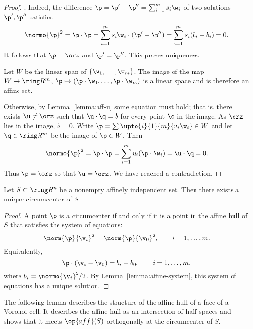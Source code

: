 \begin{cnl}
\begin{proof}
. Indeed, the difference 
$\p = \p'-\p'' = \sumupto{i}{1}{m}{ s_i \w_i}$ of two solutions
$\p',\p''$ satisfies
\[  
\normo{\p}^2=\p\cdot\p = \sumupto{i}{1}{m}{ s_i \w_i} \cdot (\p' - \p'') =
\sumupto{i}{1}{m}{ s_i (b_i-b_i)}= 0.
\] 
It follows that $\p=\orz$ and $\p'=\p''$.  This proves uniqueness.

Let $W$ be the linear span of $\setenumdots{\w}{1}{m}$.  The image of the
map $W\to\vecR{m}$, $\p\mapsto (\p\cdot\w_1,\ldots,\p\cdot\w_m)$ is
a linear space and is therefore an affine set.

Otherwise, by Lemma~\ref{lemma:aff-u} some equation must hold; that
is, there exists $\u\ne \orz$ such that $\u\cdot \q =b$ for every
point $\q$ in the image.  As $\orz$ lies in the image, $b=0$.  Write
$\p = \sum\upto{i}{1}{m}{ u_i \w_i}\in W$ and let $\q\in\vecR{m}$ be the image of
$\p\in W$.  Then
\[  
\normo{\p}^2 = \p\cdot\p = \sumupto{i}{1}{m}{ u_i (\p \cdot \w_i)} = \u\cdot \q = 0.
\]  
Thus $\p=\orz$ so that $\u=\orz$.  We have reached a contradiction.
\end{proof}

\begin{lemma}
\label{lemma:circumcenter exists}
%
Let $S\subset \vecR{n}$ be a nonempty affinely independent set.  Then
there exists a unique circumcenter of $S$.
\end{lemma}

\begin{proof} 
  A point $\p$ is a circumcenter if and only if it is a point in the
  affine hull of $S$ that satisfies the system of equations:
\[  
\norm{\p}{\v_i}^2 = \norm{\p}{\v_0}^2,\qquad \fordots{i}{1}{m}.
\] 
Equivalently,
\[  
\p\cdot (\v_i-\v_0) = b_i-b_0,\qquad \fordots{i}{1}{m},
\] 
where $b_i = \normo{\v_i}^2/2$.  By
Lemma~\ref{lemma:affine-system}, this system of equations has a unique
solution.
\end{proof}

The following lemma describes the structure of the affine hull of a
face of a Voronoi cell.  It describes the affine hull as an
intersection of half-spaces and shows that it meets $\op{aff}(S)$
orthogonally at the circumcenter of $S$.


\end{cnl}
